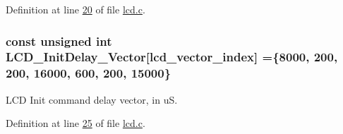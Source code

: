 Definition at line \hyperlink{lcd_8c_source_l00020}{20} of file \hyperlink{lcd_8c_source}{lcd.\-c}.

\hypertarget{group__lcd__h_gaa94f066be94d030edb2bd88f7bd2b804}{
\subsubsection[{L\-C\-D\-\_\-\-Init\-Delay\-\_\-\-Vector}]{\setlength{\rightskip}{0pt plus 5cm}const unsigned int L\-C\-D\-\_\-\-Init\-Delay\-\_\-\-Vector\mbox{[}{\bf lcd\-\_\-vector\-\_\-index}\mbox{]} =\{8000, 200, 200, 16000, 600, 200, 15000\}}}\label{group__lcd__h_gaa94f066be94d030edb2bd88f7bd2b804}
L\-C\-D Init command delay vector, in u\-S. 

Definition at line \hyperlink{lcd_8c_source_l00025}{25} of file \hyperlink{lcd_8c_source}{lcd.\-c}.

